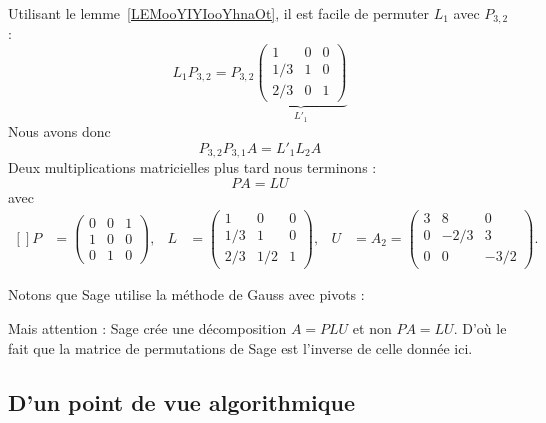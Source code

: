 \begin{example}
	Utilisant le lemme~\ref{LEMooYIYIooYhnaOt}, il est facile de permuter \( L_{1}\) avec \( P_{3,2}\) :
	\begin{equation}
		L_1P_{3,2}=P_{3,2}
		\underbrace{
			\begin{pmatrix}
				1   & 0 & 0 \\
				1/3 & 1 & 0 \\
				2/3 & 0 & 1
			\end{pmatrix}}_{L'_1}
	\end{equation}
	Nous avons donc
	\begin{equation}
		P_{3,2}P_{3,1}A=L'_1L_2A
	\end{equation}
	Deux multiplications matricielles plus tard nous terminons :
	\begin{equation}
		PA=LU
	\end{equation}
	avec
	\begin{equation}
		\begin{aligned}[]
			P & =\begin{pmatrix}
				0 & 0 & 1 \\
				1 & 0 & 0 \\
				0 & 1 & 0
			\end{pmatrix},     &
			L & =\begin{pmatrix}
				1   & 0   & 0 \\
				1/3 & 1   & 0 \\
				2/3 & 1/2 & 1
			\end{pmatrix},     &
			U & =A_2=\begin{pmatrix}
				3 & 8    & 0    \\
				0 & -2/3 & 3    \\
				0 & 0    & -3/2
			\end{pmatrix}.
		\end{aligned}
	\end{equation}
\end{example}

Notons que Sage utilise la méthode de Gauss avec pivots :

Mais attention : Sage crée une décomposition \( A=PLU\) et non \( PA=LU\). D'où le fait que la matrice de permutations de Sage est l'inverse de celle donnée ici.

\subsection{D'un point de vue algorithmique}

